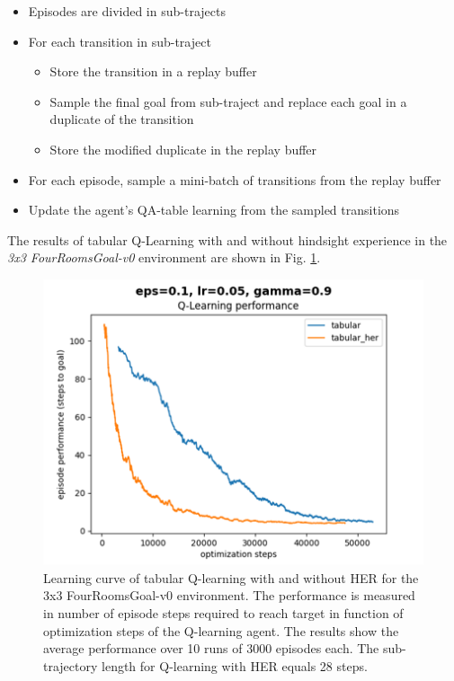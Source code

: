 \documentclass[conference]{IEEEtran}
\begin{document}
\begin{itemize}
\item Episodes are divided in sub-trajects
\item For each transition in sub-traject
    \begin{itemize}
    \item Store the transition in a replay buffer
    \item Sample the final goal from sub-traject and replace each goal in a duplicate of the transition
    \item Store the modified duplicate in the replay buffer
    \end{itemize}
\item For each episode, sample a mini-batch of transitions from the replay buffer
\item Update the agent's QA-table learning from the sampled transitions
\end{itemize}
The results of tabular Q-Learning with and without hindsight experience in the \textit{3x3 FourRoomsGoal-v0} environment are shown in Fig. \ref{fig:experiment_fourroomsgoal_learning_performance}.

\begin{figure}[ht]
\centering
\includegraphics[width=0.9\columnwidth]{img/exp_tabular_her_fourroom_small.png}
\caption{Learning curve of tabular Q-learning with and without HER for the 3x3 FourRoomsGoal-v0 environment. The performance is measured in number of episode steps required to reach target in function of optimization steps of the Q-learning agent. The results show the average performance over 10 runs of 3000 episodes each. The sub-trajectory length for Q-learning with HER equals 28 steps.}
\label{fig:experiment_fourroomsgoal_learning_performance}
\end{figure}
\end{document}
